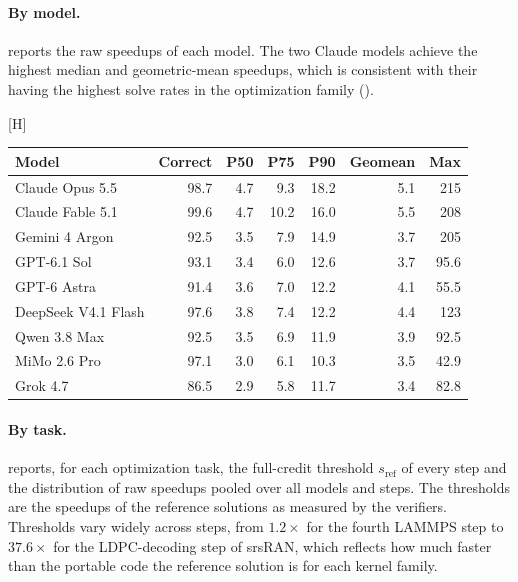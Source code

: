 \documentclass{article}
\makeatletter
\renewenvironment{table}
  {\setlength{\abovecaptionskip}{\@abovecaptionskip}%
   \setlength{\belowcaptionskip}{\@belowcaptionskip}%
   \@float{table}}
  {\end@float}
\makeatother
\begin{document}
\paragraph{By model.}
 reports the raw speedups of each model. The two
Claude models achieve the highest median and geometric-mean speedups, which is
consistent with their having the highest solve rates in the optimization
family ().

\begin{table}[H]
  \centering
  \small
  \begin{tabular}{@{}l r r r r r r@{}}
    \toprule
    Model & Correct & P50 & P75 & P90 & Geomean & Max \\
    \midrule
    Claude Opus 5.5     & 98.7 & 4.7 & 9.3 & 18.2 & 5.1 & 215 \\
    Claude Fable 5.1    & 99.6 & 4.7 & 10.2 & 16.0 & 5.5 & 208 \\
    Gemini 4 Argon      & 92.5 & 3.5 & 7.9 & 14.9 & 3.7 & 205 \\
    GPT-6.1 Sol         & 93.1 & 3.4 & 6.0 & 12.6 & 3.7 & 95.6 \\
    GPT-6 Astra         & 91.4 & 3.6 & 7.0 & 12.2 & 4.1 & 55.5 \\
    DeepSeek V4.1 Flash & 97.6 & 3.8 & 7.4 & 12.2 & 4.4 & 123 \\
    Qwen 3.8 Max        & 92.5 & 3.5 & 6.9 & 11.9 & 3.9 & 92.5 \\
    MiMo 2.6 Pro        & 97.1 & 3.0 & 6.1 & 10.3 & 3.5 & 42.9 \\
    Grok 4.7            & 86.5 & 2.9 & 5.8 & 11.7 & 3.4 & 82.8 \\
    \bottomrule
  \end{tabular}
  \caption{Raw optimization speedups by model, pooled over the 18 optimization
    tasks. Correct is the fraction of step records that pass the correctness
    gate (\%); the speedup statistics ($\times$) are computed over correct
    records.}
  \label{tab:speedup-models}
\end{table}

\paragraph{By task.}
 reports, for each optimization task, the full-credit
threshold $s_{\mathrm{ref}}$ of every step and the distribution of raw speedups pooled
over all models and steps. The thresholds are the speedups of the reference
solutions as measured by the verifiers. Thresholds vary widely across
steps, from $1.2\times$ for the fourth LAMMPS step
to $37.6\times$ for the LDPC-decoding step of srsRAN, which reflects how much
faster than the portable code the reference solution is for each kernel family.
\end{document}
